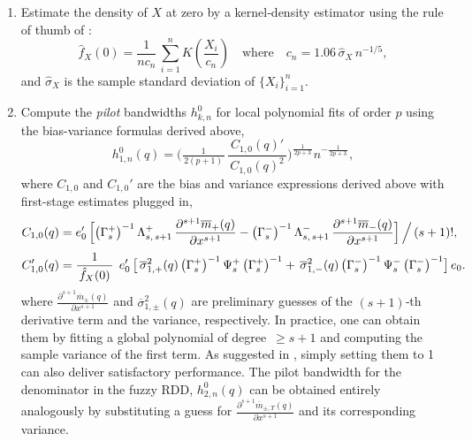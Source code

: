 \documentclass[12pt]{article}
\begin{document}
\begin{enumerate}
\item[(i)] 
Estimate the density of \(X\) at zero by a kernel‐density estimator using the rule of thumb of \citet{silverman2018density}:
\[
  \hat{f}_X(0)
  =
  \frac{1}{n c_n}\,
  \sum_{i=1}^n
    K\left(\frac{X_i}{c_n}\right)
  \quad\text{where}\quad
  c_n = 1.06\,\hat{\sigma}_X\,n^{-1/5},
\]
and \(\hat{\sigma}_X\) is the sample standard deviation of \(\{X_i\}_{i=1}^n\).

\item[(ii)]
Compute the \emph{pilot} bandwidths \(h_{k,n}^{0}\) for local polynomial fits of order \(p\) using the bias-variance formulas derived above,
\[
  h_{1,n}^0(q)
  =
  \Biggl(
     \tfrac{1}{\,2(p+1)\,}
     \,\frac{\,C_{1,0}(q)'\,}{\,C_{1,0}(q)^{2}\,}
  \Biggr)^{\!\!\frac{1}{\,2p+3\,}}
   n^{-\frac{1}{\,2p+3\,}},
\]
where \(C_{1,0}\) and \(C_{1,0}'\) are the bias and variance expressions derived above with first-stage estimates plugged in,
\[
\begin{aligned}
  C_{1,0}(q)
  &= 
  e_{0}^{\prime}
  \,\Bigl[
\bigl(\Gamma_{s}^{+}\bigr)^{-1}\,\Lambda_{s,\,s+1}^{+}\,\frac{\partial^{s+1} \overline{m}_{+}(q)}{\partial x^{s+1}}
    -
\bigl(\Gamma_{s}^{-}\bigr)^{-1}\,\Lambda_{s,\,s+1}^{-}\,\frac{\partial^{s+1} \overline{m}_{-}(q)}{\partial x^{s+1}}
  \Bigr]
  \,\Big/\,(s+1)!,
  \\[3pt]
  C_{1,0}^{\prime}(q)
  &= 
  \frac{\,1\,}{\,\hat{f}_X(0)\,}
  \;\,
  e_{0}^{\prime}
  \,\bigl[
\,\overline{\sigma}_{1,+}^{2}(q)\,
\bigl(\Gamma_{s}^{+}\bigr)^{-1}\,\Psi_{s}^{+}\,\bigl(\Gamma_{s}^{+}\bigr)^{-1}
      +
\,\overline{\sigma}_{1,-}^{2}(q)\,
\bigl(\Gamma_{s}^{-}\bigr)^{-1}\,\Psi_{s}^{-}\,\bigl(\Gamma_{s}^{-}\bigr)^{-1}
    \bigr]\,
  e_{0}.
\end{aligned}
\]
where \(\frac{\partial^{s+1} \overline{m}_{\pm}(q)}{\partial x^{s+1}}\) and \(\overline{\sigma}_{1,\pm}^{2}(q)\) are preliminary guesses of the \((s+1)\)‐th derivative term and the variance, respectively. 
  In practice, one can obtain them by fitting a global polynomial of degree \(\,\ge s+1\) and computing the sample variance of the first term. As suggested in \citet[Supp. F]{chiang2019robust}, simply setting them to 1 can also deliver satisfactory performance. The pilot bandwidth for the denominator in the fuzzy RDD, $h_{2,n}^0(q)$ can be obtained entirely analogously by substituting a guess for \(\frac{\partial^{s+1} \overline{m}_{\pm, T}(q)}{\partial x^{s+1}}\) and its corresponding variance. 
\end{enumerate}
\end{document}
